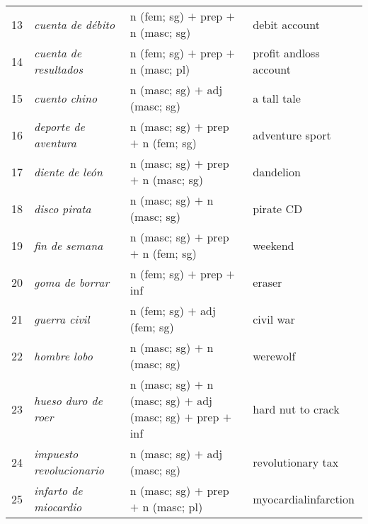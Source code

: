 \documentclass[output=paper]{langsci/langscibook}
\begin{document}
\begin{table}
\begin{tabularx}{\textwidth}{c>{\raggedright}p{2.5cm}Qp{3cm}}
13 & \textit{cuenta de débito} & n (fem; sg) $+$ prep $+$ n (masc; sg) & debit account \\
14 & \textit{cuenta de resultados} & n (fem; sg) $+$ prep $+$ n (masc; pl) & profit and\newline loss account \\
15 & \textit{cuento chino} & n (masc; sg) $+$ adj (masc; sg) & a tall tale \\
16 & \textit{deporte de aventura} & n (masc; sg) $+$ prep $+$ n (fem; sg) & adventure sport \\
17 & \textit{diente de león} & n (masc; sg) $+$ prep $+$ n (masc; sg) & dandelion \\
18 & \textit{disco pirata} & n (masc; sg) $+$ n (masc; sg) & pirate CD \\
19 & \textit{fin de semana} & n (masc; sg) $+$ prep $+$ n (fem; sg) & weekend \\
20 & \textit{goma de borrar} & n (fem; sg) $+$ prep $+$ inf & eraser \\
21 & \textit{guerra civil} & n (fem; sg) $+$ adj (fem; sg) & civil war \\
22 & \textit{hombre lobo} & n (masc; sg) $+$ n (masc; sg) & werewolf \\
23 & \textit{hueso duro de roer} & n (masc; sg) $+$ n (masc; sg) $+$   adj (masc; sg) $+$ prep $+$ inf  & hard nut to crack \\
24 & \textit{impuesto revolucionario} & n (masc; sg) $+$ adj (masc; sg) & revolutionary tax \\
25 & \textit{infarto de miocardio} & n (masc; sg) $+$ prep $+$ n (masc; pl) & myocardial\newline infarction \\
\midrule
\end{tabularx}
\end{table}
\end{document}
